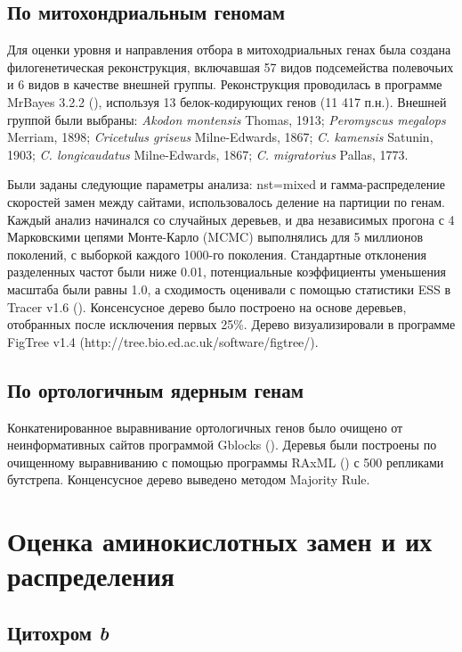 \subsection{По митохондриальным геномам}
Для оценки уровня и направления отбора в митоходриальных генах была создана филогенетическая реконструкция, включавшая 57 видов подсемейства полевочьих и 6 видов в качестве внешней группы. Реконструкция проводилась в программе MrBayes 3.2.2 (\cite{Ronquist2012}), используя 13 белок-кодирующих генов (11 417 п.н.). Внешней группой были выбраны: \textit{Akodon montensis} Thomas, 1913; \textit{Peromyscus megalops} Merriam, 1898; \textit{Cricetulus griseus} Milne-Edwards, 1867; \textit{C. kamensis} Satunin, 1903; \textit{C. longicaudatus} Milne-Edwards, 1867; \textit{C. migratorius} Pallas, 1773.
 
Были заданы следующие параметры анализа: nst=mixed и гамма-распределение скоростей замен между сайтами, использовалось деление на партиции по генам. Каждый анализ начинался со случайных деревьев, и два независимых прогона с 4 Марковскими цепями Монте-Карло (MCMC) выполнялись для 5 миллионов поколений, с выборкой каждого 1000-го поколения. Стандартные отклонения разделенных частот были ниже 0.01, потенциальные коэффициенты уменьшения масштаба были равны 1.0, а сходимость оценивали с помощью статистики ESS в Tracer v1.6 (\cite{Rambaut2014}). Консенсусное дерево было построено на основе деревьев, отобранных после исключения первых 25\%. Дерево визуализировали в программе FigTree v1.4 (http://tree.bio.ed.ac.uk/software/figtree/).

\subsection{По ортологичным ядерным генам}

Конкатенированное выравнивание ортологичных генов было очищено от неинформативных сайтов программой Gblocks (\cite{Castresana2000}). Деревья были построены по очищенному выравниванию с помощью программы RAxML (\cite{Stamatakis2014}) с 500 репликами бутстрепа. Конценсусное дерево выведено методом Majority Rule.  

\section{Оценка аминокислотных замен и их распределения}

\subsection{Цитохром \textit{b}}

